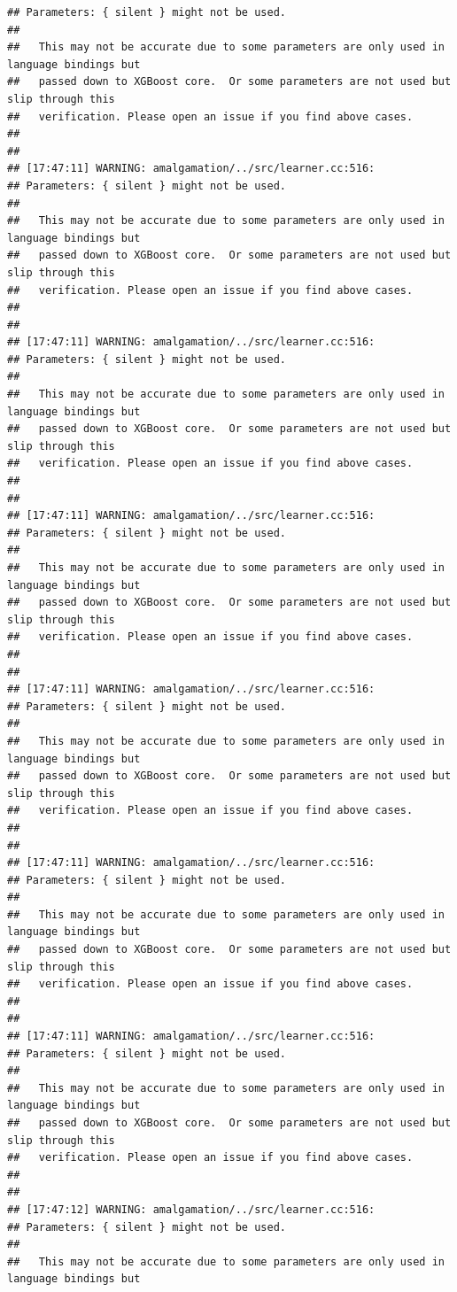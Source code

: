 \documentclass[AMS,STIX2COL]{WileyNJD-v2}\usepackage[]{graphicx}\usepackage[]{color}
\makeatletter
\newenvironment{kframe}{%
 \def\at@end@of@kframe{}%
 \ifinner\ifhmode%
  \def\at@end@of@kframe{\end{minipage}}%
  \begin{minipage}{\columnwidth}%
 \fi\fi%
 \def\FrameCommand##1{\hskip\@totalleftmargin \hskip-\fboxsep
 \colorbox{shadecolor}{##1}\hskip-\fboxsep
     \hskip-\linewidth \hskip-\@totalleftmargin \hskip\columnwidth}%
 \MakeFramed {\advance\hsize-\width
   \@totalleftmargin\z@ \linewidth\hsize
   \@setminipage}}%
 {\par\unskip\endMakeFramed%
 \at@end@of@kframe}
\newenvironment{knitrout}{}{} %
\makeatother
\begin{document}
\begin{knitrout}
\begin{kframe}
\begin{verbatim}
## Parameters: { silent } might not be used.
## 
##   This may not be accurate due to some parameters are only used in language bindings but
##   passed down to XGBoost core.  Or some parameters are not used but slip through this
##   verification. Please open an issue if you find above cases.
## 
## 
## [17:47:11] WARNING: amalgamation/../src/learner.cc:516: 
## Parameters: { silent } might not be used.
## 
##   This may not be accurate due to some parameters are only used in language bindings but
##   passed down to XGBoost core.  Or some parameters are not used but slip through this
##   verification. Please open an issue if you find above cases.
## 
## 
## [17:47:11] WARNING: amalgamation/../src/learner.cc:516: 
## Parameters: { silent } might not be used.
## 
##   This may not be accurate due to some parameters are only used in language bindings but
##   passed down to XGBoost core.  Or some parameters are not used but slip through this
##   verification. Please open an issue if you find above cases.
## 
## 
## [17:47:11] WARNING: amalgamation/../src/learner.cc:516: 
## Parameters: { silent } might not be used.
## 
##   This may not be accurate due to some parameters are only used in language bindings but
##   passed down to XGBoost core.  Or some parameters are not used but slip through this
##   verification. Please open an issue if you find above cases.
## 
## 
## [17:47:11] WARNING: amalgamation/../src/learner.cc:516: 
## Parameters: { silent } might not be used.
## 
##   This may not be accurate due to some parameters are only used in language bindings but
##   passed down to XGBoost core.  Or some parameters are not used but slip through this
##   verification. Please open an issue if you find above cases.
## 
## 
## [17:47:11] WARNING: amalgamation/../src/learner.cc:516: 
## Parameters: { silent } might not be used.
## 
##   This may not be accurate due to some parameters are only used in language bindings but
##   passed down to XGBoost core.  Or some parameters are not used but slip through this
##   verification. Please open an issue if you find above cases.
## 
## 
## [17:47:11] WARNING: amalgamation/../src/learner.cc:516: 
## Parameters: { silent } might not be used.
## 
##   This may not be accurate due to some parameters are only used in language bindings but
##   passed down to XGBoost core.  Or some parameters are not used but slip through this
##   verification. Please open an issue if you find above cases.
## 
## 
## [17:47:12] WARNING: amalgamation/../src/learner.cc:516: 
## Parameters: { silent } might not be used.
## 
##   This may not be accurate due to some parameters are only used in language bindings but

\end{verbatim}
\end{kframe}
\end{knitrout}
\end{document}
